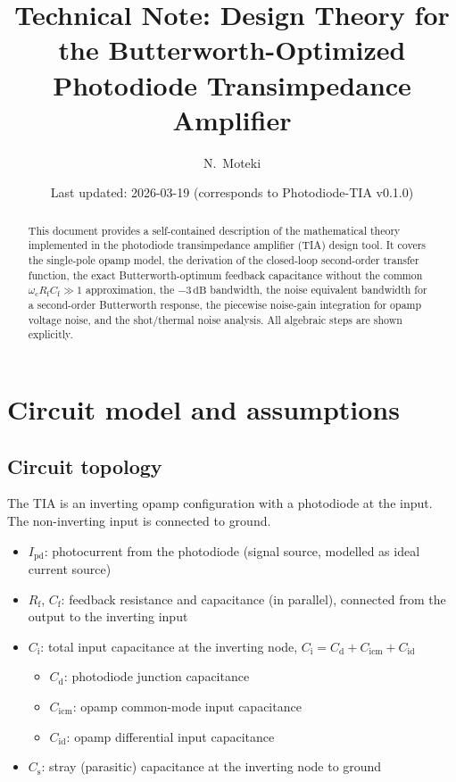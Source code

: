 \documentclass[a4paper,11pt]{article}
\title{Technical Note: Design Theory for the Butterworth-Optimized\\
Photodiode Transimpedance Amplifier}
\author{N.~Moteki}
\date{Last updated: 2026-03-19 (corresponds to Photodiode-TIA v0.1.0)}
\begin{document}
\maketitle

\begin{abstract}
This document provides a self-contained description of the mathematical
theory implemented in the photodiode transimpedance amplifier (TIA)
design tool.  It covers the single-pole opamp model, the derivation of
the closed-loop second-order transfer function, the exact
Butterworth-optimum feedback capacitance without the common
$\omega_{\mathrm{c}} R_{\mathrm{f}} C_{\mathrm{f}} \gg 1$
approximation, the $-3\,\mathrm{dB}$ bandwidth, the noise equivalent
bandwidth for a second-order Butterworth response, the piecewise
noise-gain integration for opamp voltage noise, and the shot/thermal
noise analysis.  All algebraic steps are shown explicitly.
\end{abstract}

\tableofcontents
\newpage

\section{Circuit model and assumptions}
\label{sec:circuit-model}

\subsection{Circuit topology}

The TIA is an inverting opamp configuration with a photodiode at the
input.  The non-inverting input is connected to ground.

\begin{itemize}
  \item $I_{\mathrm{pd}}$: photocurrent from the photodiode (signal
    source, modelled as ideal current source)
  \item $R_{\mathrm{f}}$, $C_{\mathrm{f}}$: feedback resistance and
    capacitance (in parallel), connected from the output to the
    inverting input
  \item $C_{\mathrm{i}}$: total input capacitance at the inverting
    node,
    $C_{\mathrm{i}} = C_{\mathrm{d}} + C_{\mathrm{icm}} + C_{\mathrm{id}}$
    \begin{itemize}
      \item $C_{\mathrm{d}}$: photodiode junction capacitance
      \item $C_{\mathrm{icm}}$: opamp common-mode input capacitance
      \item $C_{\mathrm{id}}$: opamp differential input capacitance
    \end{itemize}
  \item $C_{\mathrm{s}}$: stray (parasitic) capacitance at the
    inverting node to ground
\end{itemize}
\end{document}
